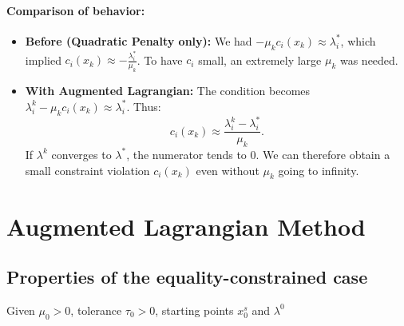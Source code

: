 \paragraph{Comparison of behavior:}
\begin{itemize}
    \item \textbf{Before (Quadratic Penalty only):} We had $-\mu_k c_i(x_k) \approx \lambda_i^*$, which implied $c_i(x_k) \approx -\frac{\lambda_i^*}{\mu_k}$. To have $c_i$ small, an extremely large $\mu_k$ was needed.
    \item \textbf{With Augmented Lagrangian:} The condition becomes $\lambda_i^k - \mu_k c_i(x_k) \approx \lambda_i^*$.
    Thus:
    \[
        c_i(x_k) \approx \frac{\lambda_i^k - \lambda_i^*}{\mu_k}.
    \]
    If $\lambda^k$ converges to $\lambda^*$, the numerator tends to 0. We can therefore obtain a small constraint violation $c_i(x_k)$ even without $\mu_k$ going to infinity.
\end{itemize}



\section{Augmented Lagrangian Method}

\subsection{Properties of the equality-constrained case}

\begin{algorithm}[H]
    \caption{Augmented Lagrangian method for equality constraints}
    \SetAlgoLined
    Given $\mu_0>0$, tolerance $\tau_0>0$, starting points $x_0^s$ and $\lambda^0$\;
\end{algorithm}

